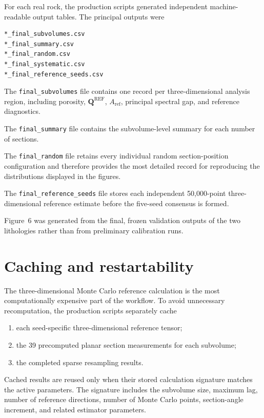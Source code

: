 \documentclass{article}
\begin{document}
For each real rock, the production scripts generated independent
machine-readable output tables. The principal outputs were

\begin{verbatim}
*_final_subvolumes.csv
*_final_summary.csv
*_final_random.csv
*_final_systematic.csv
*_final_reference_seeds.csv
\end{verbatim}

The \texttt{final\_subvolumes} file contains one record per
three-dimensional analysis region, including porosity,
$\mathbf{Q}^{\mathrm{REF}}$, $A_{\mathrm{ref}}$, principal spectral gap,
and reference diagnostics.

The \texttt{final\_summary} file contains the subvolume-level summary for
each number of sections.

The \texttt{final\_random} file retains every individual random
section-position configuration and therefore provides the most detailed
record for reproducing the distributions displayed in the figures.

The \texttt{final\_reference\_seeds} file stores each independent
50,000-point three-dimensional reference estimate before the five-seed
consensus is formed.

Figure~6 was generated from the final, frozen validation outputs of the
two lithologies rather than from preliminary calibration runs.

\section{Caching and restartability}
\label{sec:SI_cache}

The three-dimensional Monte Carlo reference calculation is the most
computationally expensive part of the workflow. To avoid unnecessary
recomputation, the production scripts separately cache

\begin{enumerate}
    \item each seed-specific three-dimensional reference tensor;
    \item the 39 precomputed planar section measurements for each
          subvolume;
    \item the completed sparse resampling results.
\end{enumerate}

Cached results are reused only when their stored calculation signature
matches the active parameters. The signature includes the subvolume
size, maximum lag, number of reference directions, number of Monte Carlo
points, section-angle increment, and related estimator parameters.
\end{document}

